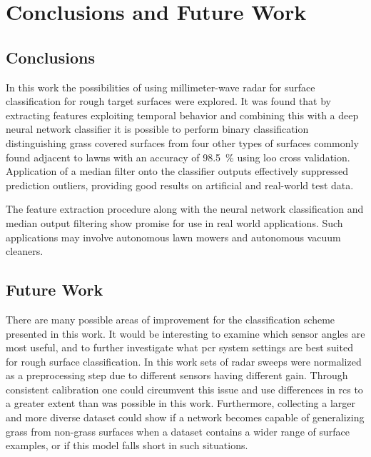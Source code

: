 \chapter{Conclusions and Future Work}

\section{Conclusions}

In this work the possibilities of using millimeter-wave radar for surface classification for rough target surfaces were explored. It was found that by extracting features exploiting temporal behavior and combining this with a deep neural network classifier it is possible to perform binary classification distinguishing grass covered surfaces from four other types of surfaces commonly found adjacent to lawns with an accuracy of 98.5~\% using \gls{loo} cross validation. Application of a median filter onto the classifier outputs effectively suppressed prediction outliers, providing good results on artificial and real-world test data. 

The feature extraction procedure along with the neural network classification and median output filtering show promise for use in real world applications. Such applications may involve autonomous lawn mowers and autonomous vacuum cleaners. 



\section{Future Work}

There are many possible areas of improvement for the classification scheme presented in this work. It would be interesting to examine which sensor angles are most useful, and to further investigate what \gls{pcr} system settings are best suited for rough surface classification. In this work sets of radar sweeps were normalized as a preprocessing step due to different sensors having different gain. Through consistent calibration one could circumvent this issue and use differences in \gls{rcs} to a greater extent than was possible in this work. Furthermore, collecting a larger and more diverse dataset could show if a network becomes capable of generalizing grass from non-grass surfaces when a dataset contains a wider range of surface examples, or if this model falls short in such situations. 

